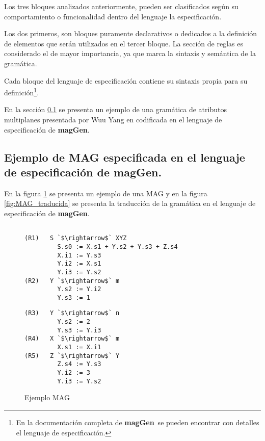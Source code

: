 \documentclass[runningheads,a4paper]{llncs}
\newcommand{\maggen}{\textbf{magGen}}
\begin{document}
Los tres bloques analizados anteriormente, pueden ser clasificados según su comportamiento o funcionalidad dentro del lenguaje la especificación.

Los dos primeros, son bloques puramente declarativos o dedicados a la definición de elementos que serán utilizados en el tercer bloque. La sección de reglas es considerado el de mayor importancia, ya que marca la sintaxis y semántica de la gramática.

Cada bloque del lenguaje de especificación contiene su sintaxis propia para su definición\footnote{En la documentación completa de \maggen\ se pueden encontrar con detalles el lenguaje de especificación.}.

En la sección \ref{ej:agwuuyang} se presenta un ejemplo de una gramática de atributos multiplanes presentada por Wuu Yang en \cite{wuu-yang1} codificada en el lenguaje de especificación de \maggen.

\subsection{Ejemplo de MAG especificada en el lenguaje de especificación de \maggen.}
\label{ej:agwuuyang}
\vspace{-0.22cm}
En la figura \ref{fig:mag_wuu_yang} se presenta un ejemplo de una MAG y en la figura \ref{fig:MAG_traducida} se presenta la traducción de la gramática en el lenguaje de especificación de \maggen.

\begin{figure}[!ht]
\vspace{-0.5cm}
\begin{minipage}{0.45\textwidth}
\begin{center} 
\begin{lstlisting}[columns=fullflexible, backgroundcolor=\color{white}]

(R1)   S `$\rightarrow$` XYZ      
         S.s0 := X.s1 + Y.s2 + Y.s3 + Z.s4
         X.i1 := Y.s3  
         Y.i2 := X.s1
         Y.i3 := Y.s2
(R2)   Y `$\rightarrow$` m        
         Y.s2 := Y.i2
         Y.s3 := 1

\end{lstlisting} 
\end{center}
\end{minipage}
\hspace{0.6cm}\begin{minipage}{0.45\textwidth}
\begin{center}
\begin{lstlisting}[columns=fullflexible, backgroundcolor=\color{white}]
(R3)   Y `$\rightarrow$` n        
         Y.s2 := 2
         Y.s3 := Y.i3
(R4)   X `$\rightarrow$` m        
         X.s1 := X.i1
(R5)   Z `$\rightarrow$` Y        
         Z.s4 := Y.s3
         Y.i2 := 3
         Y.i3 := Y.s2
\end{lstlisting} 
\end{center}
\end{minipage}
\vspace{-0,5cm}
\caption{\label{fig:mag_wuu_yang}Ejemplo MAG}
\end{figure}
\end{document}
